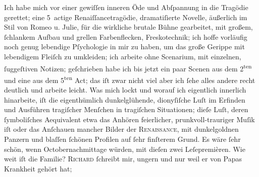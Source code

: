 \pstart
           Ich habe mich vor einer gewiſſen inneren Öde und Abſpannung in die Tragödie gerettet; eine 5 actige Renaiſſancetragödie,
               dramatiſierte Novelle, äußerlich im Stil von Romeo u.
                  Julie, für die wirkliche brutale Bühne gearbeitet, mit {\pb}großem,{ }ſchlankem Aufbau und
               grellen Farbenflecken, Freskotechnik; ich hoffe vorläufig noch genug lebendige
               Pſychologie in mir zu haben, um das große Gerippe mit lebendigem Fleiſch zu
               umkleiden; ich arbeite ohne Scenarium, mit einzelnen,{ }ſuggeſtiven Notizen;
               geſchrieben habe ich bis jetzt ein paar Scenen aus dem 2\textsuperscript{ten} und eine aus dem 5\textsuperscript{ten} Act; das iſt zwar
               nicht viel aber ich{ }ſehe alles andere recht deutlich und arbeite leicht. Was mich
               lockt und worauf ich eigentlich innerlich hinarbeite, iſt die eigenthümlich
               dunkelglühende, dionyſiſche Luſt im Erfinden und Ausführen tragiſcher Menſchen in
               tragiſchen Situationen; dieſe Luſt, deren{ }ſymboliſches Aequivalent etwa das Anhören
                  {\pb}feierlicher,
               prunkvoll-trauriger Muſik iſt oder das Anſchauen mancher Bilder der \textsc{Renaissance}, mit dunkelgoldnen Panzern und blaſſen{ }ſchönen
               Profilen auf{ }ſehr finſterem Grund. Es wäre{ }ſehr schön, wenn Octobernachmittage
               würden, mit dieſen zwei Leſepremièren. Wie weit iſt die Familie? \hspace*{2em}\textsc{Richard}{ }ſchreibt mir, ungern und nur weil er von Papas Krankheit gehört hat;
